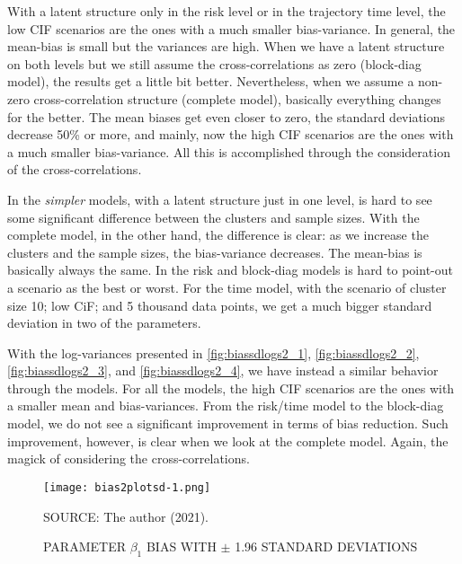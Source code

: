 With a latent structure only in the risk level or in the trajectory time
level, the low CIF scenarios are the ones with a much smaller
bias-variance. In general, the mean-bias is small but the variances are
high. When we have a latent structure on both levels but we still assume
the cross-correlations as zero (block-diag model), the results get a
little bit better. Nevertheless, when we assume a non-zero
cross-correlation structure (complete model), basically everything
changes for the better. The mean biases get even closer to zero, the
standard deviations decrease 50\% or more, and mainly, now the high CIF
scenarios are the ones with a much smaller bias-variance. All this is
accomplished through the consideration of the cross-correlations.

In the \textit{simpler} models, with a latent structure just in one
level, is hard to see some significant difference between the clusters
and sample sizes. With the complete model, in the other hand, the
difference is clear: as we increase the clusters and the sample sizes,
the bias-variance decreases. The mean-bias is basically always the
same. In the risk and block-diag models is hard to point-out a scenario
as the best or worst. For the time model, with the scenario of cluster
size 10; low CiF; and 5 thousand data points, we get a much bigger
standard deviation in two of the parameters.

With the log-variances presented in \autoref{fig:biassdlogs2_1},
\autoref{fig:biassdlogs2_2}, \autoref{fig:biassdlogs2_3}, and
\autoref{fig:biassdlogs2_4}, we have instead a similar behavior through
the models. For all the models, the high CIF scenarios are the ones with
a smaller mean and bias-variances. From the risk/time model to the
block-diag model, we do not see a significant improvement in terms of
bias reduction. Such improvement, however, is clear when we look at the
complete model. Again, the magick of considering the cross-correlations.

\begin{figure}[H]
 \setlength{\abovecaptionskip}{.0001pt}
 \caption{PARAMETER \(\beta_{1}\) BIAS WITH \(\pm\) 1.96 STANDARD
          DEVIATIONS}
 \vspace{0.2cm}\centering
 \texttt{[image: bias2plotsd-1.png]}\\
 \begin{footnotesize}
  SOURCE: The author (2021).
 \end{footnotesize}
 \label{fig:biassdbeta1}
\end{figure}

